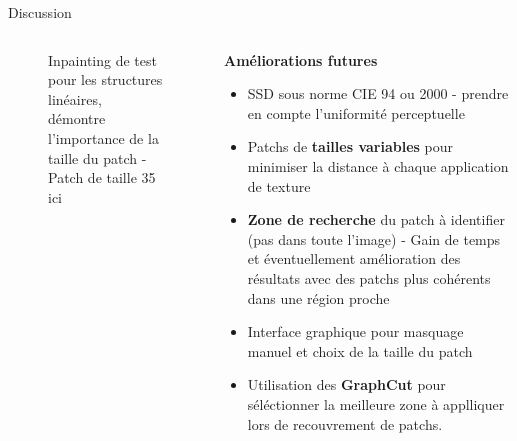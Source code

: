 \documentclass[final,hyperref={pdfpagelabels=false}]{beamer}
\begin{document}
\begin{frame}[t]
\begin{columns}[t]
\begin{column}{.930\textwidth}
\begin{block}{\Large Discussion}
\begin{columns}[t]
\begin{column}{.496\textwidth}
\begin{figure}[H]
\centering
{}
\caption{Inpainting de test pour les structures linéaires, démontre l'importance de la taille du patch - Patch de taille 35 ici}
\end{figure}

\end{column}
\begin{column}{.496\textwidth} 
\textbf{Améliorations futures}
\begin{itemize}
\item SSD sous norme CIE 94 ou 2000 - prendre en compte l'uniformité perceptuelle
\item Patchs de \textbf{tailles variables} pour minimiser la distance à chaque application de texture
\item \textbf{Zone de recherche} du patch à identifier (pas dans toute l'image) - Gain de temps et éventuellement amélioration des résultats avec des patchs plus cohérents dans une région proche
\item Interface graphique pour masquage manuel et choix de la taille du patch
\item Utilisation des \textbf{GraphCut} pour séléctionner la meilleure zone à applliquer lors de recouvrement de patchs. 
\end{itemize}


\end{column}
\end{columns}
\end{block}
\end{column}
\end{columns}
\end{frame}
\end{document}
